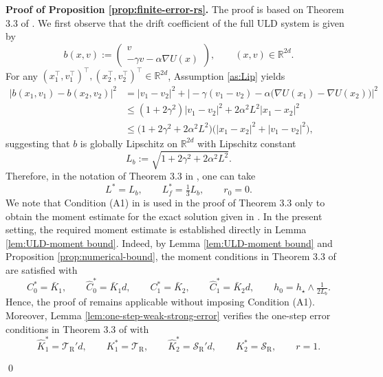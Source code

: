 \documentclass[12pt]{article}
\numberwithin{equation}{section}
\renewenvironment{proof}%
  {\begin{trivlist}%
   \item[]\ignorespaces}%
  {\qed\end{trivlist}}
\begin{document}
\begin{proof}
\textbf{Proof of Proposition \ref{prop:finite-error-rs}.}
The proof is based on Theorem 3.3 of \cite{yang2025non}. 
%
We first observe that the drift coefficient of the full ULD system is given by
\[
b(x,v)
:=
\begin{pmatrix}
v\\
-\gamma v-\alpha\nabla U(x)
\end{pmatrix},
\qquad (x,v)\in\mathbb R^{2d}.
\]
For any \((x_1^\top,v_1^\top)^\top,(x_2^\top,v_2^\top)^\top\in\mathbb R^{2d}\), Assumption \ref{as:Lip} yields
\[
\begin{aligned}
|b(x_1,v_1)-b(x_2,v_2)|^2
&=
|v_1-v_2|^2
+
\big|
-\gamma(v_1-v_2)
-\alpha
\big(
\nabla U(x_1)-\nabla U(x_2)
\big)
\big|^2
\\
&\leq
(1+2\gamma^2)|v_1-v_2|^2
+
2\alpha^2L^2|x_1-x_2|^2
\\
&\leq
\big(
1+2\gamma^2+2\alpha^2L^2
\big)
\big(
|x_1-x_2|^2+|v_1-v_2|^2
\big),
\end{aligned}
\]
suggesting that \(b\) is globally Lipschitz on \(\mathbb R^{2d}\) with Lipschitz constant
\begin{equation}\label{eq:def-L-b}
L_b
:=
\sqrt{1+2\gamma^2+2\alpha^2L^2}.
\end{equation}
Therefore, in the notation of Theorem 3.3 in \cite{yang2025non}, one can take
\begin{equation}
\label{eq:constants-Lb-Theorem-3-3}
L^*=L_b,
\qquad
L_f^*=\tfrac{1}{3}L_b,
\qquad
r_0=0.
\end{equation}
We note that Condition (A1) in \cite{yang2025non} is used in the proof of Theorem 3.3 only to obtain the moment estimate for the exact solution given in \cite[Lemma 3.1]{yang2025non}. In the present setting, the required moment estimate is established directly in Lemma \ref{lem:ULD-moment bound}.
Indeed, by Lemma \ref{lem:ULD-moment bound} and Proposition \ref{prop:numerical-bound}, the moment conditions in Theorem 3.3 of \cite{yang2025non} are satisfied with
\begin{equation}
\label{eq:moment-constants-Theorem-3-3}
C_0^*=\bar K_1,
\qquad
\hat C_0^*=\bar K_1 d,
\qquad
C_1^*=\bar K_2,
\qquad
\hat C_1^*=\bar K_2 d,
\qquad
h_0
=
h_\star
\wedge
\tfrac{1}{2L_b}.
\end{equation}
Hence, the proof of \cite[Theorem 3.3]{yang2025non} remains applicable without imposing Condition (A1). Moreover, Lemma \ref{lem:one-step-weak-strong-error} verifies the one-step error conditions in Theorem 3.3 of \cite{yang2025non} with
\begin{equation}
\label{eq:one-step-constants-Theorem-3-3}
\hat K_1^*
=
\mathcal T_{\mathrm{R}}' d,
\qquad
K_1^*
=
\mathcal T_{\mathrm{R}},
\qquad
\hat K_2^*
=
\mathcal S_{\mathrm{R}}' d,
\qquad
K_2^*
=
\mathcal S_{\mathrm{R}},
\qquad
r=1.
\end{equation}


\end{proof}
\end{document}
